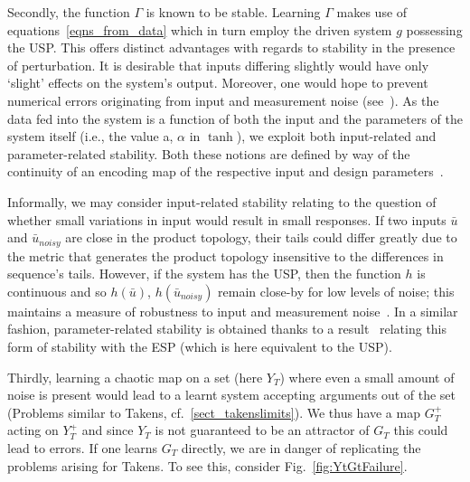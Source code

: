 
Secondly, the function $\Gamma$ is known to be stable. Learning $\Gamma$ makes use of equations~\ref{eqns_from_data} which in turn employ the driven system $g$ possessing the USP. This offers distinct advantages with regards to stability in the presence of perturbation. 
It is desirable that inputs differing slightly would have only ‘slight’ effects on the system's output. 
Moreover, one would hope to prevent numerical errors originating from input and measurement noise (see~\cite[Theorem. 5]{manjunath2021universal}). 
As the data fed into the system is a function of both the input and the parameters of the system itself (i.e., the value a, $\alpha$ in $\tanh$), we exploit both input-related and parameter-related stability. 
Both these notions are defined by way of the continuity of an encoding map of the respective input and design parameters~\cite{manjunath2020stability}.

Informally, we may consider input-related stability relating to the question of whether small variations in input would result in small responses.   
If two inputs $\bar{u}$ and $\bar{u}_{noisy}$ are close in the product topology, their tails could differ greatly due to the metric that generates the product topology insensitive to the differences in sequence's tails.
 However, if the system has the USP, then the function $h$ is continuous and so $h(\bar{u})$, $h(\bar{u}_{noisy})$ remain close-by for low levels of noise; this maintains a measure of robustness to input and measurement noise~\cite{manjunath2021universal}.
In a similar fashion, parameter-related stability is obtained thanks to a result~\cite[Lemma 3.2]{manjunath2020stability} relating this form of stability with the ESP (which is here equivalent to the USP).


Thirdly, learning a chaotic map on a set (here $Y_T$) where even a small amount of noise is present would lead to a learnt system accepting arguments out of the set (Problems similar to Takens, cf.~\ref{sect_takenslimits}). 
We thus have a map $G_T^+$ acting on $Y_T^+$ and since $Y_T$ is not guaranteed to be an attractor of $G_T$ this could lead to errors.
If one learns $G_T$ directly, we are in danger of replicating the problems arising for Takens.  To see this, consider Fig.~\ref{fig:YtGtFailure}.

